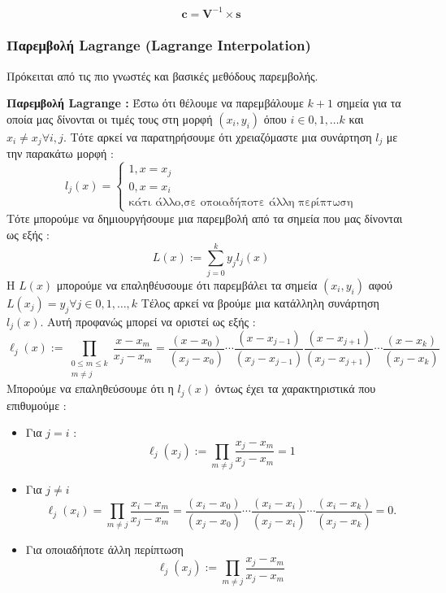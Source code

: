 $$
    \mathbf{c} = \mathbf{V}^{-1} \times \mathbf{s}
$$

\subsubsection{Παρεμβολή Lagrange (Lagrange Interpolation)}

Πρόκειται από τις πιο γνωστές και βασικές μεθόδους παρεμβολής. 
\begin{definition}
\textbf{Παρεμβολή Lagrange :}
Έστω ότι θέλουμε να παρεμβάλουμε $k+1$ σημεία για τα οποία μας δίνονται οι τιμές τους στη μορφή $\left(x_{i}, y_{i}\right)$ όπου $i \in 0, 1, \dots k$ και $x_i \ne x_j \forall i, j$. Τότε αρκεί να παρατηρήσουμε ότι χρειαζόμαστε μια συνάρτηση $l_j$ με την παρακάτω μορφή :
$$
l_{j}(x) =\begin{cases}1, x=x_j\\ 0, x = x_i\\ \text{κάτι άλλο}, \text{σε οποιαδήποτε άλλη περίπτωση}\end{cases}
$$
Τότε μπορούμε να δημιουργήσουμε μια παρεμβολή από τα σημεία που μας δίνονται ως εξής :
$$
L(x):=\sum_{j=0}^{k} y_{j} l_{j}(x)
$$
Η $L(x)$ μπορούμε να επαληθέυσουμε ότι παρεμβάλει τα σημεία $(x_i, y_i)$ αφού $L(x_j)=y_j \forall j \in 0, 1, \dots, k$
Τέλος αρκεί να βρούμε μια κατάλληλη συνάρτηση $l_j(x)$. Αυτή προφανώς μπορεί να οριστεί ως εξής :
$$
\ell_{j}(x):=\prod_{\substack{0 \leq m \leq k \\ m \neq j}} \frac{x-x_{m}}{x_{j}-x_{m}}=\frac{\left(x-x_{0}\right)}{\left(x_{j}-x_{0}\right)} \cdots \frac{\left(x-x_{j-1}\right)}{\left(x_{j}-x_{j-1}\right)} \frac{\left(x-x_{j+1}\right)}{\left(x_{j}-x_{j+1}\right)} \cdots \frac{\left(x-x_{k}\right)}{\left(x_{j}-x_{k}\right)}
$$
Μπορούμε να επαληθεύσουμε ότι η $l_j(x)$ όντως έχει τα χαρακτηριστικά που επιθυμούμε : 
\begin{itemize}
    \item Για $j=i$ : 
    $$
        \ell_{j}\left(x_{j}\right):=\prod_{m \neq j} \frac{x_{j}-x_{m}}{x_{j}-x_{m}}=1
    $$
    \item Για $j \ne i$
    $$
        \ell_{j}\left(x_{i}\right)=\prod_{m \neq j} \frac{x_{i}-x_{m}}{x_{j}-x_{m}}=\frac{\left(x_{i}-x_{0}\right)}{\left(x_{j}-x_{0}\right)} \cdots     \frac{\left(x_{i}-x_{i}\right)}{\left(x_{j}-x_{i}\right)} \cdots \frac{\left(x_{i}-x_{k}\right)}{\left(x_{j}-x_{k}\right)}=0 .
    $$
    \item Για οποιαδήποτε άλλη περίπτωση
    $$
        \ell_{j}\left(x_{j}\right):=\prod_{m \neq j} \frac{x_{j}-x_{m}}{x_{j}-x_{m}}
    $$
\end{itemize}

\end{definition}